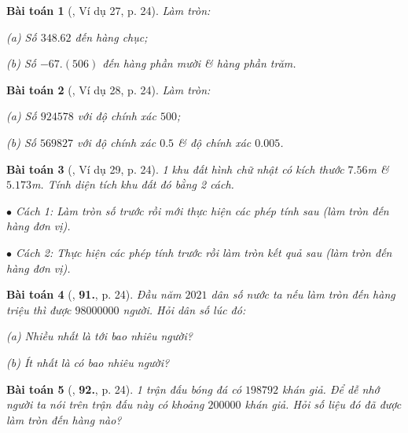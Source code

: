 \documentclass{article}
\numberwithin{equation}{section}
\newtheorem{baitoan}{Bài toán}
\begin{document}
\begin{baitoan}[\cite{Tuyen_Toan_7}, Ví dụ 27, p. 24]
	Làm tròn:
	\begin{enumerate*}
		\item[(a)] Số $348.62$ đến hàng chục;
		\item[(b)] Số $-67.(506)$ đến hàng phần mười \& hàng phần trăm.
	\end{enumerate*}
\end{baitoan}

\begin{baitoan}[\cite{Tuyen_Toan_7}, Ví dụ 28, p. 24]
	Làm tròn:
	\begin{enumerate*}
		\item[(a)] Số $924578$ với độ chính xác $500$;
		\item[(b)] Số $569827$ với độ chính xác $0.5$ \& độ chính xác $0.005$.
	\end{enumerate*}
\end{baitoan}

\begin{baitoan}[\cite{Tuyen_Toan_7}, Ví dụ 29, p. 24]
	1 khu đất hình chữ nhật có kích thước $7.56$\emph{m} \& $5.173$\emph{m}. Tính diện tích khu đất đó bằng 2 cách.
	\begin{enumerate*}
		\item[$\bullet$] Cách 1: Làm tròn số trước rồi mới thực hiện các phép tính sau (làm tròn đến hàng đơn vị).
		\item[$\bullet$] Cách 2: Thực hiện các phép tính trước rồi làm tròn kết quả sau (làm tròn đến hàng đơn vị).
	\end{enumerate*}
\end{baitoan}

\begin{baitoan}[\cite{Tuyen_Toan_7}, \textbf{91.}, p. 24]
	Đầu năm $2021$ dân số nước ta nếu làm tròn đến hàng triệu thì được $98000000$ người. Hỏi dân số lúc đó:
	\begin{enumerate*}
		\item[(a)] Nhiều nhất là tới bao nhiêu người?
		\item[(b)] Ít nhất là có bao nhiêu người? 
	\end{enumerate*}
\end{baitoan}

\begin{baitoan}[\cite{Tuyen_Toan_7}, \textbf{92.}, p. 24]
	1 trận đấu bóng đá có $198 792$ khán giả. Để dễ nhớ người ta nói trên trận đấu này có khoảng $200000$ khán giả. Hỏi số liệu đó đã được làm tròn đến hàng nào?
\end{baitoan}
\end{document}

